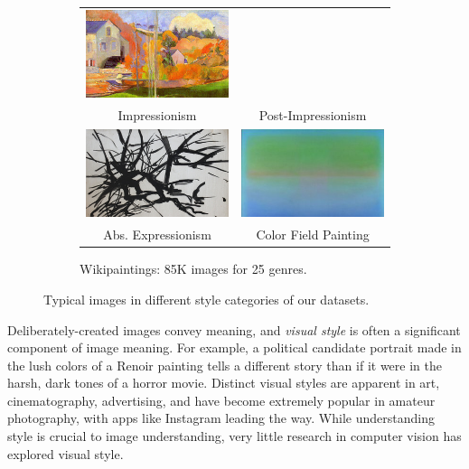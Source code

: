 \begin{figure}[t]
{\begin{subfigure}[t]{0.48\linewidth}
\begin{tabular}{cc}
        \includegraphics[width=.43\linewidth]{../style/figures/wikipaintingsDatasetExamples/used/resized/post_impressionism-0.jpg} \\
    Impressionism & Post-Impressionism \\
        \includegraphics[width=.43\linewidth]{../style/figures/wikipaintingsDatasetExamples/used/resized/abs_expressionism-0.jpg} &
    \includegraphics[width=.43\linewidth]{../style/figures/wikipaintingsDatasetExamples/used/resized/color_field-0.jpg} \\
    Abs. Expressionism & Color Field Painting \\
    \end{tabular}
    \caption{
        Wikipaintings: 85K images for 25 genres.
    }\label{fig:wikipaintings_style_examples}
\end{subfigure}
}
\caption{
    Typical images in different style categories of our datasets.
}\label{fig:style_examples}
\end{figure}

Deliberately-created images convey meaning, and \textit{visual style} is often a significant component of image meaning.
For example, a political candidate portrait made in the lush colors of a Renoir painting tells a different story than if it were in the harsh, dark tones of a horror movie.
Distinct visual styles are apparent in art, cinematography, advertising, and have become extremely popular in amateur photography, with apps like Instagram leading the way.
While understanding style is crucial to image understanding, very little research in computer vision has explored visual style.

